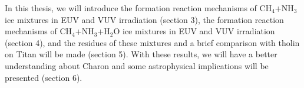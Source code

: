 In this thesis, we will introduce the formation reaction mechanisms of CH$_4$+NH$_3$ ice mixtures in EUV and VUV irradiation (section 3), the formation reaction mechanisms of CH$_4$+NH$_3$+H$_2$O ice mixtures in EUV and VUV irradiation (section 4), and the residues of these mixtures and a brief comparison with tholin on Titan will be made (section 5). With these results, we will have a better understanding about Charon and some astrophysical implications will be presented (section 6).\\
